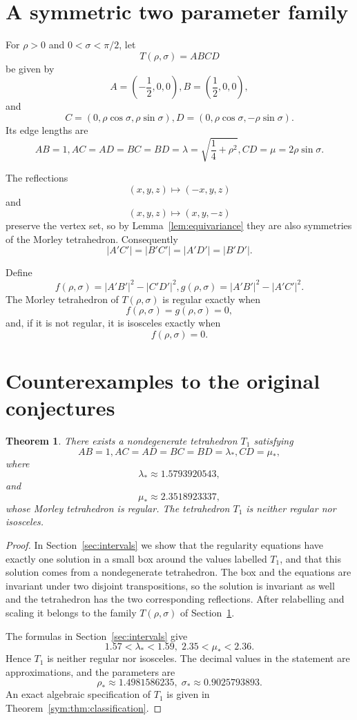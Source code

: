 \documentclass[11pt]{article}
\newtheorem{theorem}{Theorem}[section]
\theoremstyle{definition}
\theoremstyle{remark}
\begin{document}
\section{A symmetric two parameter family}\label{sec:family}

For $\rho>0$ and $0<\sigma<\pi/2$, let
\[
T(\rho,\sigma)=ABCD
\]
be given by
\[
A=\left(-\frac12,0,0\right), B=\left(\frac12,0,0\right),
\]
and
\[
C=(0,\rho\cos\sigma,\rho\sin\sigma), D=(0,\rho\cos\sigma,-\rho\sin\sigma).
\]
Its edge lengths are
\[
AB=1, AC=AD=BC=BD=\lambda=\sqrt{\frac14+\rho^2},
CD=\mu=2\rho\sin\sigma.
\]

The reflections
\[
(x,y,z)\longmapsto(-x,y,z)
\]
and
\[
(x,y,z)\longmapsto(x,y,-z)
\]
preserve the vertex set, so by Lemma~\ref{lem:equivariance} they are also symmetries of the Morley tetrahedron. Consequently
\[
|A'C'|=|B'C'|=|A'D'|=|B'D'|.
\]

Define
\[
f(\rho,\sigma)=|A'B'|^2-|C'D'|^2,
g(\rho,\sigma)=|A'B'|^2-|A'C'|^2.
\]
The Morley tetrahedron of $T(\rho,\sigma)$ is regular exactly when
\[
f(\rho,\sigma)=g(\rho,\sigma)=0,
\]
and, if it is not regular, it is isosceles exactly when
\[
f(\rho,\sigma)=0.
\]

\section{Counterexamples to the original conjectures}
\label{sec:counterexamples}

\begin{theorem}
\label{thm:T1} There exists a nondegenerate tetrahedron $T_1$ satisfying
\[
AB=1, AC=AD=BC=BD=\lambda_*,
CD=\mu_*,
\]
where
\[
\lambda_*\approx1.5793920543,
\]
and
\[
\mu_*\approx2.3518923337,
\]
whose Morley tetrahedron is regular. The tetrahedron $T_1$ is neither regular nor isosceles.
\end{theorem}

\begin{proof}
In Section~\ref{sec:intervals} we show that the regularity equations have exactly one solution in a small box around the values labelled $T_1$, and that this solution comes from a nondegenerate tetrahedron. The box and the equations are invariant under two disjoint transpositions, so the solution is invariant as well and the tetrahedron has the two corresponding reflections. After relabelling and scaling it belongs to the family $T(\rho,\sigma)$ of Section~\ref{sec:family}.

The formulas in Section~\ref{sec:intervals} give
\[
1.57<\lambda_*<1.59,\; 2.35<\mu_*<2.36.
\]
Hence $T_1$ is neither regular nor isosceles. The decimal values in the statement are approximations, and the parameters are
\[
\rho_*\approx1.4981586235,\; \sigma_*\approx0.9025793893.
\]
An exact algebraic specification of $T_1$ is given in Theorem~\ref{sym:thm:classification}.
\end{proof}
\end{document}
